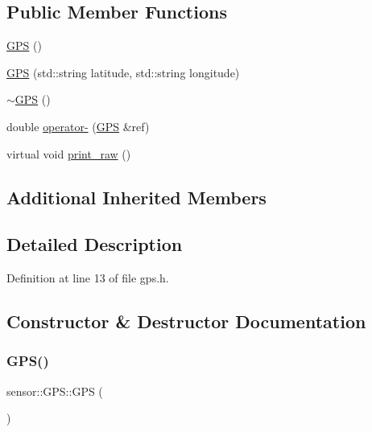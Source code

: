 \subsection*{Public Member Functions}
\begin{DoxyCompactItemize}
\item 
\hyperlink{classsensor_1_1_g_p_s_aee655f2d2f29485e622e75a38d15420c}{G\+PS} ()
\item 
\hyperlink{classsensor_1_1_g_p_s_a14837a509a3f16ebdd2f2ba5088f9b3f}{G\+PS} (std\+::string latitude, std\+::string longitude)
\item 
\hyperlink{classsensor_1_1_g_p_s_a40c60af10a932120408155ca430cbe34}{$\sim$\+G\+PS} ()
\item 
double \hyperlink{classsensor_1_1_g_p_s_a5d2f338838b59c6e980ff96bf5bc8087}{operator-\/} (\hyperlink{classsensor_1_1_g_p_s}{G\+PS} \&ref)
\item 
virtual void \hyperlink{classsensor_1_1_g_p_s_a8b0dfe608735ccca47bae8e9a41e1298}{print\+\_\+raw} ()
\end{DoxyCompactItemize}
\subsection*{Additional Inherited Members}


\subsection{Detailed Description}


Definition at line 13 of file gps.\+h.



\subsection{Constructor \& Destructor Documentation}
\mbox{\label{classsensor_1_1_g_p_s_aee655f2d2f29485e622e75a38d15420c}} 
\subsubsection{\texorpdfstring{G\+P\+S()}{GPS()}\hspace{0.1cm}{\footnotesize\ttfamily [1/2]}}
{\footnotesize\ttfamily sensor\+::\+G\+P\+S\+::\+G\+PS (\begin{DoxyParamCaption}{ }\end{DoxyParamCaption})}



